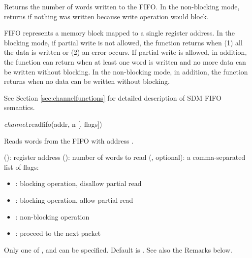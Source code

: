 \documentclass[a4paper,12pt,twoside,extrafontsizes]{memoir}
\begin{document}
\begin{funcret}
	Returns the number of words written to the FIFO. In the non-blocking mode, returns  if nothing was written because write operation would block.
\end{funcret}

\begin{funcremarks}
	FIFO represents a memory block mapped to a single register address. In the blocking mode, if partial write is not allowed, the function returns when (1) all the data is written or (2) an error occurs. If partial write is allowed, in addition, the function can return when at least one word is written and no more data can be written without blocking. In the non-blocking mode, in addition, the function returns when no data can be written without blocking.
	
	See Section \ref{sec:channelfunctions} for detailed description of SDM FIFO semantics.
\end{funcremarks}


\begin{luafuncprototype}
\emph{channel}.readfifo(addr, n [, flags])
\end{luafuncprototype}

\begin{funcdescr}
	Reads  words from the FIFO with address .
\end{funcdescr}

\begin{funcparams}
	 (): register address
	 (): number of words to read
	 (, optional): a comma-separated list of flags:
		\begin{itemize}
			\item {}: blocking operation, disallow partial read
			\item {}: blocking operation, allow partial read
			\item {}: non-blocking operation
			\item {}: proceed to the next packet
		\end{itemize}
		
		Only one of ,  and  can be specified. Default is . See also the Remarks below.
\end{funcparams}
\end{document}
